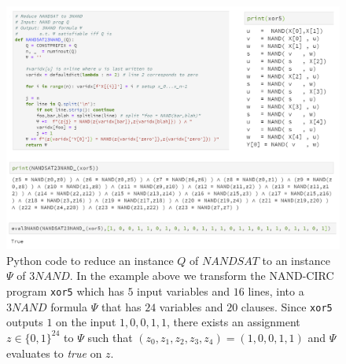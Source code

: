 \begin{figure}
\centering
\includegraphics[width=\textwidth, height=0.25\paperheight, keepaspectratio]{../figure/nandsatto3nandreduction.png}
\caption{Python code to reduce an instance \(Q\) of
\(\ensuremath{\mathit{NANDSAT}}\) to an instance \(\Psi\) of
\(3\ensuremath{\mathit{NAND}}\). In the example above we transform the
NAND-CIRC program \texttt{xor5} which has \(5\) input variables and
\(16\) lines, into a \(3\ensuremath{\mathit{NAND}}\) formula \(\Psi\)
that has \(24\) variables and \(20\) clauses. Since \texttt{xor5}
outputs \(1\) on the input \(1,0,0,1,1\), there exists an assignment
\(z \in \{0,1\}^{24}\) to \(\Psi\) such that
\((z_0,z_1,z_2,z_3,z_4)=(1,0,0,1,1)\) and \(\Psi\) evaluates to
\emph{true} on \(z\).}
\label{nandsattothreenandfig}
\end{figure}

